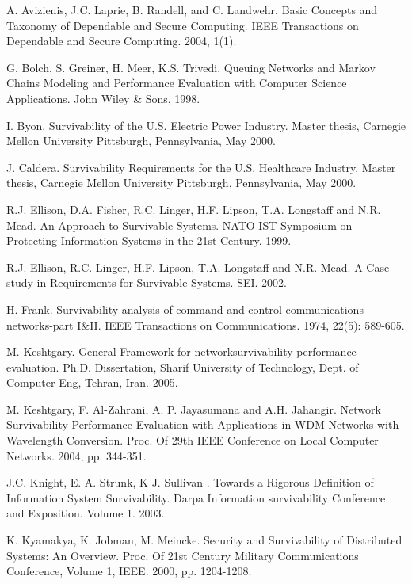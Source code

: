 \documentclass[onecolumn,conference]{IEEEtran}
\begin{document}
   
    \begin{thebibliography}{00}
         A. Avizienis, J.C. Laprie, B. Randell, and C. Landwehr. Basic Concepts and Taxonomy of Dependable and Secure Computing. IEEE Transactions on Dependable and Secure Computing. 2004, 1(1).

         G. Bolch, S. Greiner, H. Meer, K.S. Trivedi. Queuing Networks and Markov Chains Modeling and Performance Evaluation with Computer Science Applications.  John Wiley \& Sons, 1998.

         I. Byon. Survivability of the U.S. Electric Power Industry. Master thesis, Carnegie Mellon University Pittsburgh, Pennsylvania, May 2000.

         J. Caldera. Survivability Requirements for the U.S. Healthcare Industry. Master thesis, Carnegie Mellon University Pittsburgh, Pennsylvania, May 2000.

         R.J. Ellison, D.A. Fisher, R.C. Linger, H.F. Lipson, T.A. Longstaff and N.R. Mead. An Approach to Survivable Systems. NATO IST Symposium on Protecting Information Systems in the 21st Century. 1999.

         R.J. Ellison, R.C. Linger, H.F. Lipson, T.A. Longstaff and N.R. Mead. A Case study in Requirements for Survivable Systems. SEI. 2002.

         H. Frank. Survivability analysis of command and control communications networks-part I\&II. IEEE Transactions on Communications. 1974, 22(5): 589-605.

         M. Keshtgary. General Framework for networksurvivability performance evaluation.  Ph.D. Dissertation, Sharif University of Technology, Dept. of Computer Eng, Tehran, Iran. 2005.

         M. Keshtgary, F. Al-Zahrani, A. P. Jayasumana  and A.H. Jahangir. Network Survivability Performance Evaluation with Applications in WDM Networks with Wavelength Conversion.  Proc. Of 29th IEEE Conference on Local Computer Networks. 2004, pp. 344-351.

         J.C. Knight, E. A. Strunk, K J. Sullivan . Towards a Rigorous Definition of Information System Survivability. Darpa Information survivability Conference and Exposition. Volume 1. 2003.

         K. Kyamakya, K. Jobman, M. Meincke. Security and Survivability of Distributed Systems: An Overview. Proc. Of 21st Century Military Communications Conference, Volume 1, IEEE. 2000, pp. 1204-1208.


\end{thebibliography}
\end{document}
